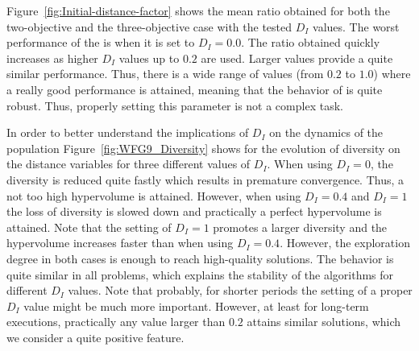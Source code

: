 Figure~\ref{fig:Initial-distance-factor} shows the mean \HV{} ratio obtained for both the two-objective 
and the three-objective case with the tested $D_I$ values.
%
The worst performance of the \AVSDMOEAD{} is when it is set to $D_I=0.0$.
%
The \HV{} ratio obtained quickly increases as higher $D_I$ values up to $0.2$ are used.
%
Larger values provide a quite similar performance.
%
Thus, there is a wide range of values (from $0.2$ to $1.0$) where a really good performance is attained, 
meaning that the behavior of \AVSDMOEAD{} is quite robust.
%
Thus, properly setting this parameter is not a complex task.

In order to better understand the implications of $D_I$ on the dynamics of the population Figure~\ref{fig:WFG9_Diversity}
shows for \AVSDMOEAD{} the evolution of diversity on the distance variables for three different values of $D_I$.
%
When using $D_I = 0$, the diversity is reduced quite fastly which results in premature convergence.
%
Thus, a not too high hypervolume is attained.
%
However, when using $D_I = 0.4$ and $D_I = 1$ the loss of diversity is slowed down and practically a perfect hypervolume
is attained.
%
Note that the setting of $D_I = 1$ promotes a larger diversity and the hypervolume increases faster than when using
$D_I = 0.4$.
%
However, the exploration degree in both cases is enough to reach high-quality solutions.
%
The behavior is quite similar in all problems, which explains the stability of the algorithms for
different $D_I$ values.
%
Note that probably, for shorter periods the setting of a proper $D_I$ value might be much more important.
%
However, at least for long-term executions, practically any value larger than $0.2$ attains similar solutions,
which we consider a quite positive feature.


%
%
%
%
%
%
%
%
%


